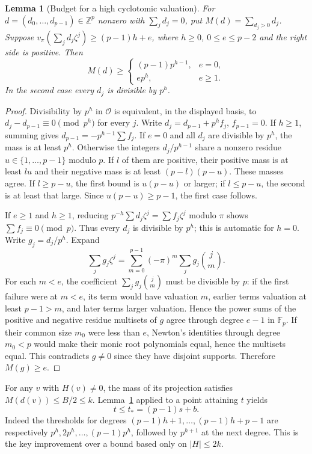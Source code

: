 \documentclass[11pt]{article}
\newtheorem{lemma}[theorem]{Lemma}
\theoremstyle{definition}\newtheorem{definition}[theorem]{Definition}
\theoremstyle{remark}\newtheorem{remark}[theorem]{Remark}
\newcommand{\F}{\mathbb F}
\newcommand{\Z}{\mathbb Z}
\begin{document}
\begin{lemma}[Budget for a high cyclotomic valuation]\label{lem:budget}
For $d=(d_0,\dots,d_{p-1})\in\Z^p$ nonzero with $\sum_j d_j=0$, put $M(d)=\sum_{d_j>0}d_j$. Suppose $v_\pi(\sum_jd_j\zeta^j)\ge (p-1)h+e$, where $h\ge0$, $0\le e\le p-2$ and the right side is positive. Then
\begin{equation}\label{eq:budget}
 M(d)\ge\begin{cases}
 (p-1)p^{h-1},&e=0,\\
 e p^h,&e\ge1.
 \end{cases}
\end{equation}
In the second case every $d_j$ is divisible by $p^h$.
\end{lemma}
\begin{proof}
Divisibility by $p^h$ in $\mathcal O$ is equivalent, in the displayed basis, to $d_j-d_{p-1}\equiv0\pmod{p^h}$ for every $j$. Write $d_j=d_{p-1}+p^h f_j$, $f_{p-1}=0$. If $h\ge1$, summing gives $d_{p-1}=-p^{h-1}\sum f_j$. If $e=0$ and all $d_j$ are divisible by $p^h$, the mass is at least $p^h$. Otherwise the integers $d_j/p^{h-1}$ share a nonzero residue $u\in\{1,\ldots,p-1\}$ modulo $p$. If $l$ of them are positive, their positive mass is at least $lu$ and their negative mass is at least $(p-l)(p-u)$. These masses agree. If $l\ge p-u$, the first bound is $u(p-u)$ or larger; if $l\le p-u$, the second is at least that large. Since $u(p-u)\ge p-1$, the first case follows.

If $e\ge1$ and $h\ge1$, reducing $p^{-h}\sum d_j\zeta^j=\sum f_j\zeta^j$ modulo $\pi$ shows $\sum f_j\equiv0\pmod p$. Thus every $d_j$ is divisible by $p^h$; this is automatic for $h=0$. Write $g_j=d_j/p^h$. Expand
\[
 \sum_jg_j\zeta^j=\sum_{m=0}^{p-1}(-\pi)^m\sum_jg_j\binom jm.
\]
For each $m<e$, the coefficient $\sum_jg_j\binom jm$ must be divisible by $p$: if the first failure were at $m<e$, its term would have valuation $m$, earlier terms valuation at least $p-1>m$, and later terms larger valuation. Hence the power sums of the positive and negative residue multisets of $g$ agree through degree $e-1$ in $\F_p$. If their common size $m_0$ were less than $e$, Newton's identities through degree $m_0<p$ would make their monic root polynomials equal, hence the multisets equal. This contradicts $g\ne0$ since they have disjoint supports. Therefore $M(g)\ge e$.
\end{proof}

For any $v$ with $H(v)\ne0$, the mass of its projection satisfies $M(d(v))\le B/2\le k$. Lemma~\ref{lem:budget} applied to a point attaining $t$ yields
\begin{equation}\label{eq:tmax}
 t\le t_*=(p-1)s+b.
\end{equation}
Indeed the thresholds for degrees $(p-1)h+1,\ldots,(p-1)h+p-1$ are respectively $p^h,2p^h,\ldots,(p-1)p^h$, followed by $p^{h+1}$ at the next degree. This is the key improvement over a bound based only on $|H|\le2k$.
\end{document}
